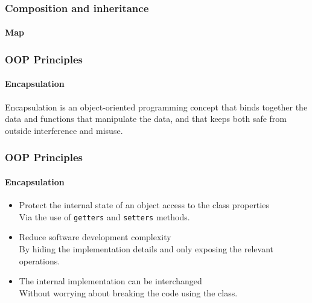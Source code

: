\begin{frame}[fragile,c]
    \frametitle{Composition and inheritance}
    \framesubtitle{Map}

\end{frame}

\begin{frame}
    \frametitle{OOP Principles}
    \framesubtitle{Encapsulation}

    Encapsulation is an object-oriented programming concept that binds together the data and functions that manipulate the data,
    and that keeps both safe from outside interference and misuse.
\end{frame}

\begin{frame}
    \frametitle{OOP Principles}
    \framesubtitle{Encapsulation}

    \begin{itemize}
        \item Protect the internal state of an object access to the class properties\pause
              \textcolor{ecgrey!50}{
              \\Via the use of \texttt{getters} and \texttt{setters} methods}.
        \pause
        \item Reduce software development complexity\pause
              \textcolor{ecgrey!50}{
              \\By hiding the implementation details and only exposing the relevant operations.}
        \pause
        \item The internal implementation can be interchanged\pause
              \textcolor{ecgrey!50}{
              \\Without worrying about breaking the code using the class.}
    \end{itemize}
\end{frame}

